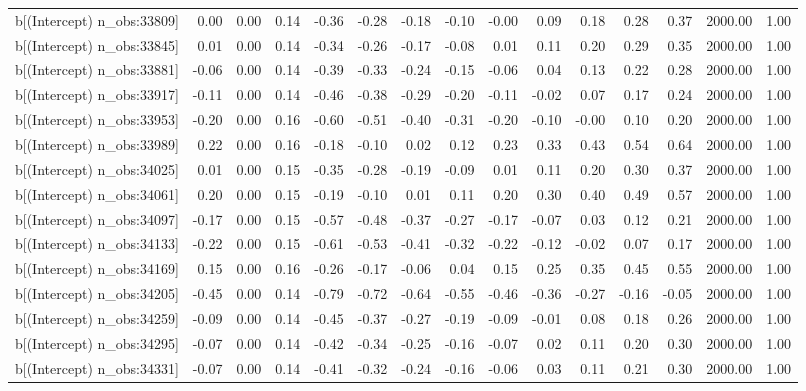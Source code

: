 \begin{table}[ht]
\begin{tabular}{rrrrrrrrrrrrrrr}
  b[(Intercept) n\_obs:33809] & 0.00 & 0.00 & 0.14 & -0.36 & -0.28 & -0.18 & -0.10 & -0.00 & 0.09 & 0.18 & 0.28 & 0.37 & 2000.00 & 1.00 \\ 
  b[(Intercept) n\_obs:33845] & 0.01 & 0.00 & 0.14 & -0.34 & -0.26 & -0.17 & -0.08 & 0.01 & 0.11 & 0.20 & 0.29 & 0.35 & 2000.00 & 1.00 \\ 
  b[(Intercept) n\_obs:33881] & -0.06 & 0.00 & 0.14 & -0.39 & -0.33 & -0.24 & -0.15 & -0.06 & 0.04 & 0.13 & 0.22 & 0.28 & 2000.00 & 1.00 \\ 
  b[(Intercept) n\_obs:33917] & -0.11 & 0.00 & 0.14 & -0.46 & -0.38 & -0.29 & -0.20 & -0.11 & -0.02 & 0.07 & 0.17 & 0.24 & 2000.00 & 1.00 \\ 
  b[(Intercept) n\_obs:33953] & -0.20 & 0.00 & 0.16 & -0.60 & -0.51 & -0.40 & -0.31 & -0.20 & -0.10 & -0.00 & 0.10 & 0.20 & 2000.00 & 1.00 \\ 
  b[(Intercept) n\_obs:33989] & 0.22 & 0.00 & 0.16 & -0.18 & -0.10 & 0.02 & 0.12 & 0.23 & 0.33 & 0.43 & 0.54 & 0.64 & 2000.00 & 1.00 \\ 
  b[(Intercept) n\_obs:34025] & 0.01 & 0.00 & 0.15 & -0.35 & -0.28 & -0.19 & -0.09 & 0.01 & 0.11 & 0.20 & 0.30 & 0.37 & 2000.00 & 1.00 \\ 
  b[(Intercept) n\_obs:34061] & 0.20 & 0.00 & 0.15 & -0.19 & -0.10 & 0.01 & 0.11 & 0.20 & 0.30 & 0.40 & 0.49 & 0.57 & 2000.00 & 1.00 \\ 
  b[(Intercept) n\_obs:34097] & -0.17 & 0.00 & 0.15 & -0.57 & -0.48 & -0.37 & -0.27 & -0.17 & -0.07 & 0.03 & 0.12 & 0.21 & 2000.00 & 1.00 \\ 
  b[(Intercept) n\_obs:34133] & -0.22 & 0.00 & 0.15 & -0.61 & -0.53 & -0.41 & -0.32 & -0.22 & -0.12 & -0.02 & 0.07 & 0.17 & 2000.00 & 1.00 \\ 
  b[(Intercept) n\_obs:34169] & 0.15 & 0.00 & 0.16 & -0.26 & -0.17 & -0.06 & 0.04 & 0.15 & 0.25 & 0.35 & 0.45 & 0.55 & 2000.00 & 1.00 \\ 
  b[(Intercept) n\_obs:34205] & -0.45 & 0.00 & 0.14 & -0.79 & -0.72 & -0.64 & -0.55 & -0.46 & -0.36 & -0.27 & -0.16 & -0.05 & 2000.00 & 1.00 \\ 
  b[(Intercept) n\_obs:34259] & -0.09 & 0.00 & 0.14 & -0.45 & -0.37 & -0.27 & -0.19 & -0.09 & -0.01 & 0.08 & 0.18 & 0.26 & 2000.00 & 1.00 \\ 
  b[(Intercept) n\_obs:34295] & -0.07 & 0.00 & 0.14 & -0.42 & -0.34 & -0.25 & -0.16 & -0.07 & 0.02 & 0.11 & 0.20 & 0.30 & 2000.00 & 1.00 \\ 
  b[(Intercept) n\_obs:34331] & -0.07 & 0.00 & 0.14 & -0.41 & -0.32 & -0.24 & -0.16 & -0.06 & 0.03 & 0.11 & 0.21 & 0.30 & 2000.00 & 1.00 \\ 

\end{tabular}
\end{table}
